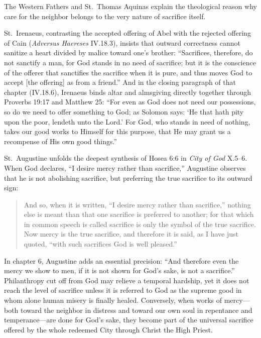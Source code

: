 The Western Fathers and St.\ Thomas Aquinas explain the theological reason why care for the neighbor belongs to the very nature of sacrifice itself.

St.\ Irenaeus, contrasting the accepted offering of Abel with the rejected offering of Cain (\emph{Adversus Haereses} IV.18.3), insists that outward correctness cannot sanitize a heart divided by malice toward one's brother: ``Sacrifices, therefore, do not sanctify a man, for God stands in no need of sacrifice; but it is the conscience of the offerer that sanctifies the sacrifice when it is pure, and thus moves God to accept [the offering] as from a friend.'' And in the closing paragraph of that chapter (IV.18.6), Irenaeus binds altar and almsgiving directly together through Proverbs 19:17 and Matthew 25: ``For even as God does not need our possessions, so do we need to offer something to God; as Solomon says: `He that hath pity upon the poor, lendeth unto the Lord.' For God, who stands in need of nothing, takes our good works to Himself for this purpose, that He may grant us a recompense of His own good things.''

St.\ Augustine unfolds the deepest synthesis of Hosea 6:6 in \emph{City of God} X.5--6. When God declares, ``I desire mercy rather than sacrifice,'' Augustine observes that he is not abolishing sacrifice, but preferring the true sacrifice to its outward sign:

\begin{quote}
And so, when it is written, ``I desire mercy rather than sacrifice,'' nothing else is meant than that one sacrifice is preferred to another; for that which in common speech is called sacrifice is only the symbol of the true sacrifice. Now mercy is the true sacrifice, and therefore it is said, as I have just quoted, ``with such sacrifices God is well pleased.''
\end{quote}

In chapter 6, Augustine adds an essential precision: ``And therefore even the mercy we show to men, if it is not shown for God's sake, is not a sacrifice.'' Philanthropy cut off from God may relieve a temporal hardship, yet it does not reach the level of sacrifice unless it is referred to God as the supreme good in whom alone human misery is finally healed. Conversely, when works of mercy---both toward the neighbor in distress and toward our own soul in repentance and temperance---are done for God's sake, they become part of the universal sacrifice offered by the whole redeemed City through Christ the High Priest.


